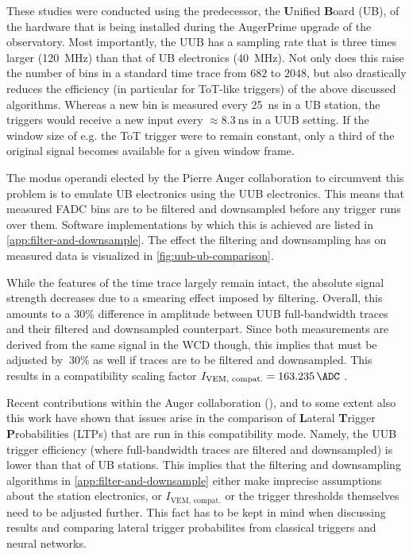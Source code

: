 These studies were conducted using the predecessor, the \textbf{U}nified \textbf{B}oard (UB), of the hardware that is being installed during the AugerPrime upgrade
of the observatory. Most importantly, the UUB has a sampling rate that is three times larger (\SI{120}{\mega\hertz}) than that of UB electronics 
(\SI{40}{\mega\hertz}). Not only does this raise the number of bins in a standard time trace from $682$ to $2048$, but also drastically reduces the efficiency 
(in particular for ToT-like triggers) of the above discussed algorithms. Whereas a new  bin is measured every \SI{25}{\nano\second} in a UB station, the triggers 
would receive a new input every $\approx\SI{8.3}{\nano\second}$ in a UUB setting. If the window size of e.g. the ToT trigger were to remain constant, only a third
of the original signal becomes available for a given window frame.

The modus operandi elected by the Pierre Auger collaboration to circumvent this problem is to emulate UB electronics using the UUB electronics. This means that 
measured FADC bins are to be filtered and downsampled before any trigger runs over them. Software implementations by which this is achieved are listed in 
\autoref{app:filter-and-downsample}. The effect the filtering and downsampling has on measured data is visualized in \autoref{fig:uub-ub-comparison}.

While the features of the time trace largely remain intact, the absolute signal strength decreases due to a smearing effect imposed by filtering. Overall, this
amounts to a $30\%$ difference in amplitude between UUB full-bandwidth traces and their filtered and downsampled counterpart. Since both measurements are derived 
from the same signal in the WCD though, this implies that \Ipeak must be adjusted by $~30\%$ as well if traces are to be filtered and downsampled. This results in 
a compatibility scaling factor $I_\text{VEM, compat.} = \SI{163.235}{\ADC}$ \cite{OfflineSource}.

Recent contributions within the Auger collaboration (\cite{nitzTriggers, quentinComparison}), and to some extent also this work have shown that issues arise in the 
comparison of \textbf{L}ateral \textbf{T}rigger \textbf{P}robabilities (LTPs) that are run in this compatibility mode. Namely, the UUB trigger efficiency (where 
full-bandwidth traces are filtered and downsampled) is lower than that of UB stations. This implies that the filtering and downsampling algorithms in 
\autoref{app:filter-and-downsample} either make imprecise assumptions about the station electronics, or $I_\text{VEM, compat.}$ or the trigger thresholds 
themselves need to be adjusted further. This fact has to be kept in mind when discussing results and comparing lateral trigger probabilites from classical triggers
and neural networks. 

